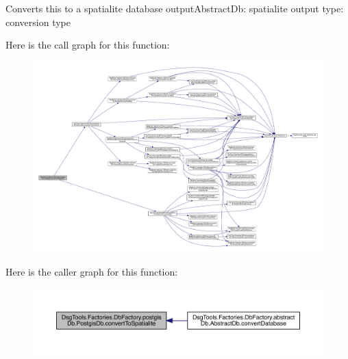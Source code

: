 \begin{DoxyVerb}Converts this to a spatialite database
outputAbstractDb: spatialite output
type: conversion type
\end{DoxyVerb}
 Here is the call graph for this function\+:
\nopagebreak
\begin{figure}[H]
\begin{center}
\leavevmode
\includegraphics[width=350pt]{class_dsg_tools_1_1_factories_1_1_db_factory_1_1postgis_db_1_1_postgis_db_ac900af7485f736aa0337be6b7e758ef0_cgraph}
\end{center}
\end{figure}
Here is the caller graph for this function\+:
\nopagebreak
\begin{figure}[H]
\begin{center}
\leavevmode
\includegraphics[width=350pt]{class_dsg_tools_1_1_factories_1_1_db_factory_1_1postgis_db_1_1_postgis_db_ac900af7485f736aa0337be6b7e758ef0_icgraph}
\end{center}
\end{figure}
\mbox{\label{class_dsg_tools_1_1_factories_1_1_db_factory_1_1postgis_db_1_1_postgis_db_abb6d0f167872d464d073857cca981dc4}} 
